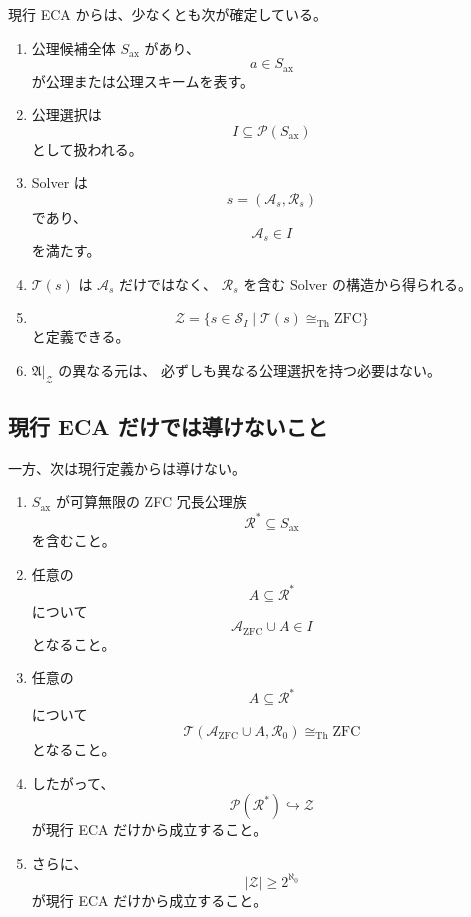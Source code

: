 \documentclass[a4paper,11pt]{jsarticle}
\newcommand{\Solver}{\mathcal{S}}
\newcommand{\Ax}{S_{\mathrm{ax}}}
\newcommand{\Sel}{I}
\begin{document}
現行 ECA からは、少なくとも次が確定している。

\begin{enumerate}
\item
公理候補全体 $\Ax$ があり、
\[
a\in\Ax
\]
が公理または公理スキームを表す。

\item
公理選択は
\[
\Sel\subseteq\mathcal{P}(\Ax)
\]
として扱われる。

\item
Solver は
\[
s=(\mathcal{A}_s,\mathcal{R}_s)
\]
であり、
\[
\mathcal{A}_s\in\Sel
\]
を満たす。

\item
$\mathcal{T}(s)$ は $\mathcal{A}_s$ だけではなく、
$\mathcal{R}_s$ を含む Solver の構造から得られる。

\item
\[
\mathcal{Z}
=
\{s\in\Solver_{\Sel}\mid
\mathcal{T}(s)\cong_{\mathrm{Th}}\mathrm{ZFC}\}
\]
と定義できる。

\item
$\mathfrak{A}|_{\mathcal{Z}}$ の異なる元は、
必ずしも異なる公理選択を持つ必要はない。
\end{enumerate}

\subsection{現行 ECA だけでは導けないこと}

一方、次は現行定義からは導けない。

\begin{enumerate}
\item
$\Ax$ が可算無限の ZFC 冗長公理族
\[
\mathcal{R}^{*}\subseteq\Ax
\]
を含むこと。

\item
任意の
\[
A\subseteq\mathcal{R}^{*}
\]
について
\[
\mathcal{A}_{\mathrm{ZFC}}\cup A\in\Sel
\]
となること。

\item
任意の
\[
A\subseteq\mathcal{R}^{*}
\]
について
\[
\mathcal{T}
\left(
\mathcal{A}_{\mathrm{ZFC}}\cup A,\mathcal{R}_0
\right)
\cong_{\mathrm{Th}}\mathrm{ZFC}
\]
となること。

\item
したがって、
\[
\mathcal{P}(\mathcal{R}^{*})\hookrightarrow\mathcal{Z}
\]
が現行 ECA だけから成立すること。

\item
さらに、
\[
|\mathcal{Z}|\ge2^{\aleph_0}
\]
が現行 ECA だけから成立すること。
\end{enumerate}
\end{document}
